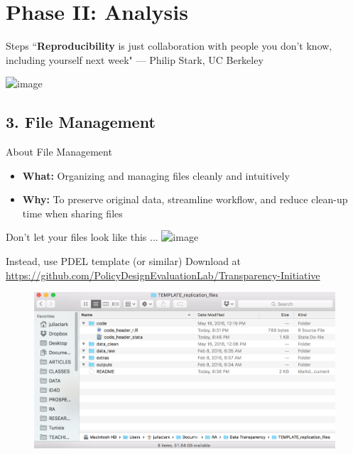 \documentclass[12pt, compress]{beamer} %
\let\noteitem\item %
\renewcommand{\item}{ 
	\noteitem\vspace{\fill}
	}
\newcommand{\ig}{\includegraphics}
\begin{document}

\section{Phase II: Analysis}

	\begin{frame}{Steps}
	\centering
		``\textbf{Reproducibility} is just collaboration with people you don’t know, including yourself next week" --- Philip Stark, UC Berkeley
		
		\bigskip
			\ig[width=\textwidth]{ii_analysis.png}
	\end{frame}
	

\subsection{3. File Management}	

	\begin{frame}{About File Management}
		\begin{itemize}
			\item \textbf{What:} Organizing and managing files cleanly and intuitively
			\item \textbf{Why:} To preserve original data, streamline workflow, and reduce clean-up time when sharing files
		\end{itemize}
	\end{frame}

	\begin{frame}{Don't let your files look like this ... }
		\centering
		  \ig[width= .80\textwidth]{bad_file_structure}
	\end{frame}	
	
	\begin{frame}{Instead, use PDEL template (or similar)}
	\centering
	Download at \url{https://github.com/PolicyDesignEvaluationLab/Transparency-Initiative}
			\begin{figure}[H]
			  \includegraphics[width= \textwidth]{pdel_structure}
			\end{figure}
	\end{frame}
	
\end{document}
